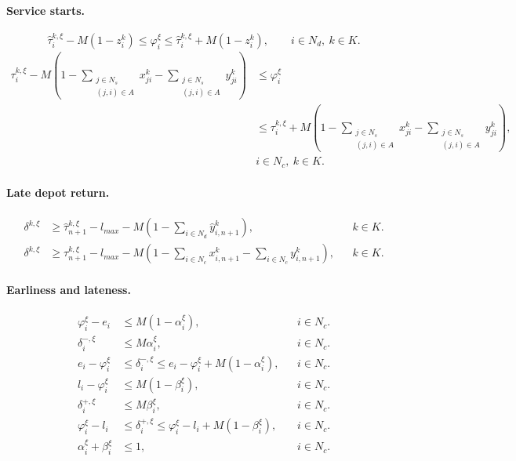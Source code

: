 \documentclass[10pt]{article}
\begin{document}
\paragraph{Service starts.}
\begin{equation}
\hat\tau_i^{k,\xi}-M(1-z_i^k)\leq\varphi_i^\xi\leq\hat\tau_i^{k,\xi}+M(1-z_i^k),
\qquad i\in N_d,\ k\in K.\tag{17a}
\end{equation}
\begin{equation}
\begin{aligned}
\tau_i^{k,\xi}-M\left(1-\sum_{\substack{j\in N_s\\(j,i)\in A}}x_{ji}^k-\sum_{\substack{j\in N_s\\(j,i)\in A}}y_{ji}^k\right)
&\leq\varphi_i^\xi\\
&\leq\tau_i^{k,\xi}+M\left(1-\sum_{\substack{j\in N_s\\(j,i)\in A}}x_{ji}^k-\sum_{\substack{j\in N_s\\(j,i)\in A}}y_{ji}^k\right),\\
&i\in N_c,\ k\in K.
\end{aligned}\tag{17b}
\end{equation}

\paragraph{Late depot return.}
\begin{align}
\delta^{k,\xi}&\geq\hat\tau_{n+1}^{k,\xi}-l_{max}-M\left(1-\sum_{i\in N_d}\hat y_{i,n+1}^k\right),
&&k\in K.\tag{18a}\\
\delta^{k,\xi}&\geq\tau_{n+1}^{k,\xi}-l_{max}-M\left(1-\sum_{i\in N_c}x_{i,n+1}^k-\sum_{i\in N_c}y_{i,n+1}^k\right),
&&k\in K.\tag{18b}
\end{align}

\paragraph{Earliness and lateness.}
\begin{align}
\varphi_i^\xi-e_i&\leq M(1-\alpha_i^\xi),&&i\in N_c.\tag{19a}\\
\delta_i^{-,\xi}&\leq M\alpha_i^\xi,&&i\in N_c.\tag{19b}\\
e_i-\varphi_i^\xi&\leq\delta_i^{-,\xi}\leq e_i-\varphi_i^\xi+M(1-\alpha_i^\xi),&&i\in N_c.\tag{19c}\\
l_i-\varphi_i^\xi&\leq M(1-\beta_i^\xi),&&i\in N_c.\tag{19d}\\
\delta_i^{+,\xi}&\leq M\beta_i^\xi,&&i\in N_c.\tag{19e}\\
\varphi_i^\xi-l_i&\leq\delta_i^{+,\xi}\leq\varphi_i^\xi-l_i+M(1-\beta_i^\xi),&&i\in N_c.\tag{19f}\\
\alpha_i^\xi+\beta_i^\xi&\leq1,&&i\in N_c.\tag{19g}
\end{align}
\end{document}
